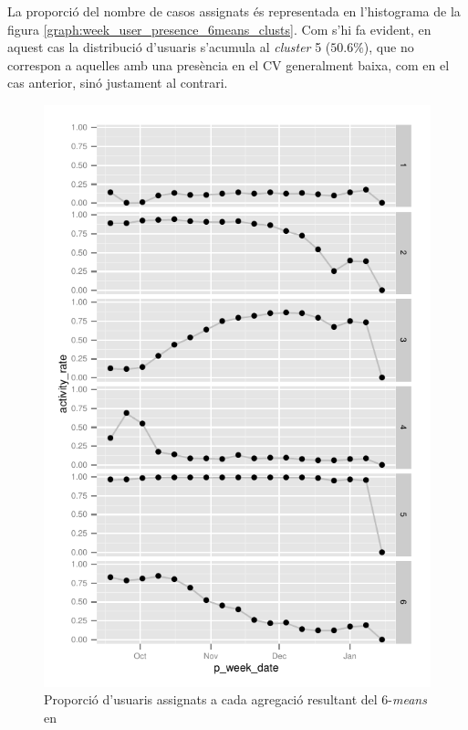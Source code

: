 \documentclass[
	a4paper,
	twoside,
	justified
]{tufte-book}
\begin{document}
La proporció del nombre de casos assignats és representada en l'histograma de la figura \ref{graph:week_user_presence_6means_clusts}. Com s'hi fa evident, en aquest cas la distribució d'usuaris s'acumula al \emph{cluster} 5 ($50.6\%$), que no correspon a aquelles amb una presència en el CV generalment baixa, com en el cas anterior, sinó justament al contrari. 

\begin{figure}
\begin{center}
\includegraphics{week_presence_6_clust}
\caption{
\label{graph:week_presence_6_clust}
	Proporció d'usuaris assignats a cada agregació resultant del 6-\emph{means} en  
}
\end{center}
\end{figure}
\end{document}
